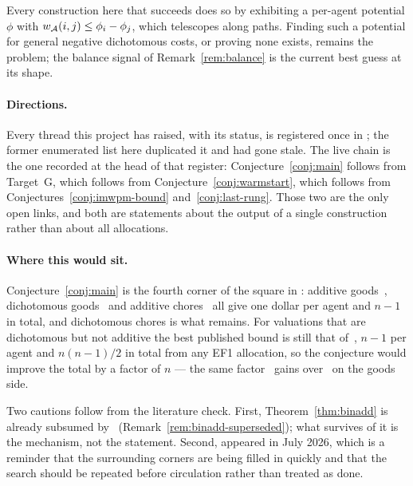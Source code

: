 Every construction here that succeeds does so by exhibiting a per-agent
potential $\phi$ with $w_{\mathcal{A}}(i,j) \le \phi_i - \phi_j$, which
telescopes along paths. Finding such a potential for general negative
dichotomous costs, or proving none exists, remains the problem; the balance
signal of Remark~\ref{rem:balance} is the current best guess at its shape.

\paragraph{Directions.}
Every thread this project has raised, with its status, is registered once in
; the former enumerated list here duplicated it and had gone
stale. The live chain is the one recorded at the head of that register:
Conjecture~\ref{conj:main} follows from Target~G, which follows from
Conjecture~\ref{conj:warmstart}, which follows from
Conjectures~\ref{conj:imwpm-bound} and~\ref{conj:last-rung}. Those two are the
only open links, and both are statements about the output of a single
construction rather than about all allocations.

\paragraph{Where this would sit.}
Conjecture~\ref{conj:main} is the fourth corner of the square in
: additive goods~\cite{BDNSV20}, dichotomous
goods~\cite{BKNS22} and additive chores~\cite{LMS26} all give one dollar per
agent and $n-1$ in total, and dichotomous chores is what remains. For valuations
that are dichotomous but not additive the best published bound is still that
of~\cite{KMSTY24}, $n-1$ per agent and $n(n-1)/2$ in total from any EF1
allocation, so the conjecture would improve the total by a factor of $n$ ---
the same factor~\cite{BKNS22} gains over~\cite{BDNSV20} on the goods side.

Two cautions follow from the literature check. First,
Theorem~\ref{thm:binadd} is already subsumed by~\cite{LMS26}
(Remark~\ref{rem:binadd-superseded}); what survives of it is the mechanism, not
the statement. Second, \cite{LMS26} appeared in July 2026, which is a reminder
that the surrounding corners are being filled in quickly and that the search
should be repeated before circulation rather than treated as done.

